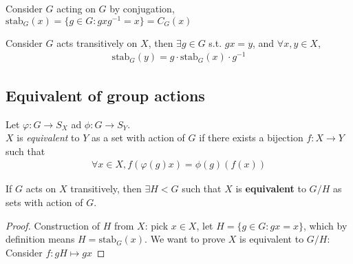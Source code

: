 \begin{remark}
    Consider $G$ acting on $G$ by conjugation, $\text{stab}_G(x) = \{ g \in G : gxg^{-1} = x\} = C_G(x)$
\end{remark}
    
\begin{prop}
    Consider $G$ acts transitively on $X$, then $\exists g \in G$ s.t. $gx=y$, and $\forall x,y \in X$,
    \begin{align*}
        \text{stab}_G(y) = g\cdot \text{stab}_G(x)\cdot g^{-1}
    \end{align*}
\end{prop}

\subsection{Equivalent of group actions} \label{sec:}

\begin{definition} Let $\varphi: G \to S_X$ ad $\phi: G \to S_Y$.
\\ $X$ is \textit{equivalent} to $Y$ as a set with action of $G$ if there exists a bijection $f: X \to Y$ such that
\begin{align*}
    \forall x \in X, f(\varphi(g)x) = \phi(g)(f(x))
\end{align*}
\end{definition}

\begin{intuition}
\end{intuition}

\begin{theorem}
If $G$ acts on $X$ transitively, then $\exists H < G$ such that $X$ is \textbf{equivalent} to $G/H$ as sets with action of $G$.
\end{theorem}
\begin{proof}
Construction of $H$ from $X$: pick $x \in X$, let $H = \{  g \in G : gx=x \}$, which by definition means $H = \text{stab}_G(x)$.
We want to prove $X$ is equivalent to $G/H$:
\\Consider $f: gH \mapsto gx$
\end{proof}

\begin{intuition}
\end{intuition}

